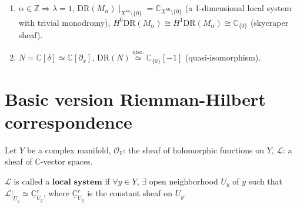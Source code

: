 \begin{example}
\begin{enumerate}
        \item $\alpha \in \mathbb{Z} \Rightarrow \lambda = 1$, $\mathrm{DR}(M_{\alpha}) \mid_{X^\mathrm{an} \setminus \{0\}} = \mathbb{C}_{X^\mathrm{an} \setminus \{0\}}$ (a 1-dimensional local system with trivial monodromy), $H^{0}\mathrm{DR}(M_{\alpha}) \cong H^{1}\mathrm{DR}(M_{\alpha}) \cong \mathbb{C}_{\{0\}}$ (skycraper sheaf).

        \item $N=\mathbb{C}[\delta]\simeq \mathbb{C}[\partial_{x}]$, $\mathrm{DR}(N)\overset{\text{qiso.}}{\simeq} \mathbb{C}_{\{0\}}[-1]$ (quasi-isomorphism).
    \end{enumerate}
\end{example}

\section{Basic version Riemman-Hilbert correspondence}

Let $Y$ be a complex manifold, $\mathcal{O}_Y$: the sheaf of holomorphic functions on $Y$, $\mathcal{L}$: a sheaf of $\mathbb{C}$-vector spaces.

\begin{definition}\label{def:local-system}
    $\mathcal{L}$ is called a $\textbf{local system}$ if $\forall y \in Y$, $\exists$ open neighborhood $U_y$ of $y$ such that $\mathcal{L}|_{U_y} \simeq\underline{\mathbb{C}}^r_{U_y}$, where $\underline{\mathbb{C}}^{r}_{U_y}$ is the constant sheaf on $U_y$.
\end{definition}

